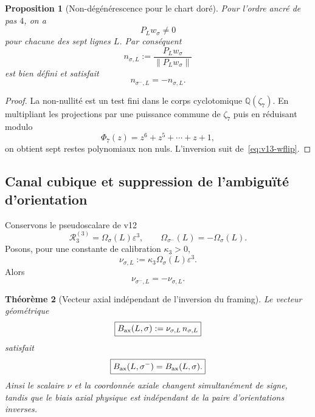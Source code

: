 \documentclass[11pt,a4paper]{article}
\newtheorem{theorem}{Théorème}[section]
\newtheorem{proposition}[theorem]{Proposition}
\begin{document}
\begin{proposition}[Non-dégénérescence pour le chart doré]\label{prop:v13-axis-project}
Pour l'ordre ancré de pas $4$, on a
\[
 P_Lw_\sigma\ne0
\]
pour chacune des sept lignes $L$. Par conséquent
\begin{equation}\label{eq:v13-oriented-axis}
 \boxed{
 n_{\sigma,L}
 :=
 \frac{P_Lw_\sigma}{\|P_Lw_\sigma\|}}
\end{equation}
est bien défini et satisfait
\begin{equation}\label{eq:v13-nflip}
 \boxed{n_{\sigma^-,L}=-n_{\sigma,L}.}
\end{equation}
\end{proposition}

\begin{proof}
La non-nullité est un test fini dans le corps cyclotomique $\mathbb Q(\zeta_7)$. En multipliant les projections par une puissance commune de $\zeta_7$ puis en réduisant modulo
\[
 \Phi_7(z)=z^6+z^5+\cdots+z+1,
\]
on obtient sept restes polynomiaux non nuls. L'inversion suit de~\eqref{eq:v13-wflip}.
\end{proof}

\subsection{Canal cubique et suppression de l'ambiguïté d'orientation}

Conservons le pseudoscalare de v12
\[
 \mathscr R_3^{(3)}
 =
 \Omega_\sigma(L)\varepsilon^3,
 \qquad
 \Omega_{\sigma^-}(L)=-\Omega_\sigma(L).
\]
Posons, pour une constante de calibration $\kappa_3>0$,
\begin{equation}\label{eq:v13-nu}
 \boxed{
 \nu_{\sigma,L}
 :=
 \kappa_3\Omega_\sigma(L)\varepsilon^3.}
\end{equation}
Alors
\[
 \nu_{\sigma^-,L}=-\nu_{\sigma,L}.
\]

\begin{theorem}[Vecteur axial indépendant de l'inversion du framing]\label{thm:v13-axial-vector}
Le vecteur géométrique
\begin{equation}\label{eq:v13-axial-vector}
 \boxed{
 B_{\rm ax}(L,\sigma)
 :=
 \nu_{\sigma,L}\,n_{\sigma,L}}
\end{equation}
satisfait
\begin{equation}\label{eq:v13-axial-vector-invariant}
 \boxed{
 B_{\rm ax}(L,\sigma^-)
 =
 B_{\rm ax}(L,\sigma).}
\end{equation}
Ainsi le scalaire $\nu$ et la coordonnée axiale changent simultanément de signe, tandis que le biais axial physique est indépendant de la paire d'orientations inverses.
\end{theorem}
\end{document}
